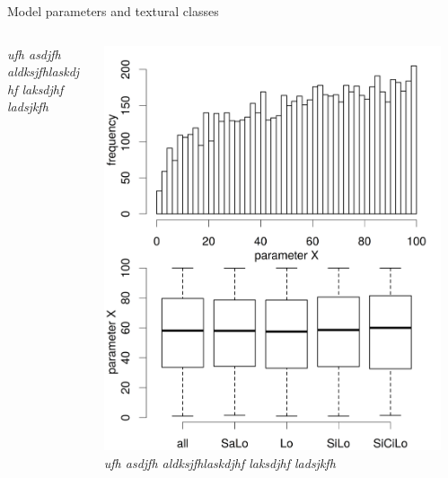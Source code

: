 \begin{block}{Model parameters and textural classes}
\begin{columns}
\begin{column}{0.25\textwidth}
            {\it ufh asdjfh aldksjfhlaskdjhf laksdjhf ladsjkfh }
        \end{column}
        \begin{column}{0.25\textwidth}
            \includegraphics[width = \textwidth]{obr/mc_x.png}
            {\it ufh asdjfh aldksjfhlaskdjhf laksdjhf ladsjkfh }
        \end{column}
        \begin{column}{0.25\textwidth}

\end{column}
\end{columns}
\end{block}
